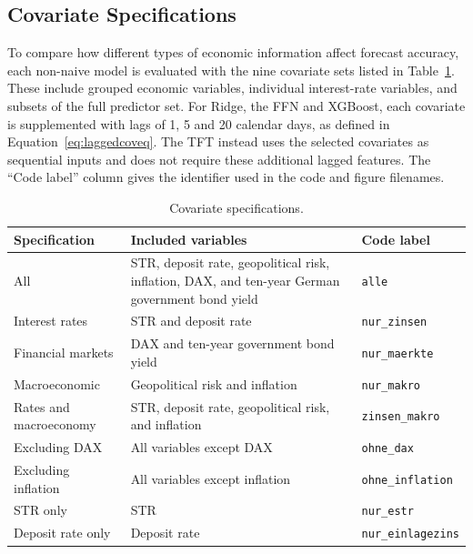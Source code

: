 \documentclass[11pt,a4paper]{article}
\newcommand{\estr}{\mbox{\texteuro STR}}
\begin{document}
\subsection{Covariate Specifications}
\label{subsec:covariates}

To compare how different types of economic information affect forecast
accuracy, each non-naive model is evaluated with the nine covariate sets
listed in Table~\ref{tab:covariate_sets}. These include grouped economic
variables, individual interest-rate variables, and subsets of the full
predictor set. For Ridge, the FFN and XGBoost, each covariate is supplemented
with lags of 1, 5 and 20 calendar days, as defined in
Equation~\eqref{eq:laggedcoveq}. The TFT instead uses the selected covariates
as sequential inputs and does not require these additional lagged features.
The ``Code label'' column gives the identifier used in the code and figure
filenames.

\begin{table}[htbp]
    \centering
    \small
    \caption{Covariate specifications.}
    \label{tab:covariate_sets}
    \begin{tabularx}{\textwidth}{l X l}
        \toprule
        Specification & Included variables & Code label \\
        \midrule
        All & \estr, deposit rate, geopolitical risk, inflation, DAX,
        and ten-year German government bond yield & \texttt{alle} \\
        Interest rates & \estr{} and deposit rate & \texttt{nur\_zinsen} \\
        Financial markets & DAX and ten-year government bond yield &
        \texttt{nur\_maerkte} \\
        Macroeconomic & Geopolitical risk and inflation & \texttt{nur\_makro} \\
        Rates and macroeconomy & \estr, deposit rate, geopolitical risk,
        and inflation & \texttt{zinsen\_makro} \\
        Excluding DAX & All variables except DAX & \texttt{ohne\_dax} \\
        Excluding inflation & All variables except inflation &
        \texttt{ohne\_inflation} \\
        \estr{} only & \estr & \texttt{nur\_estr} \\
        Deposit rate only & Deposit rate & \texttt{nur\_einlagezins} \\
        \bottomrule
    \end{tabularx}
\end{table}
\end{document}
